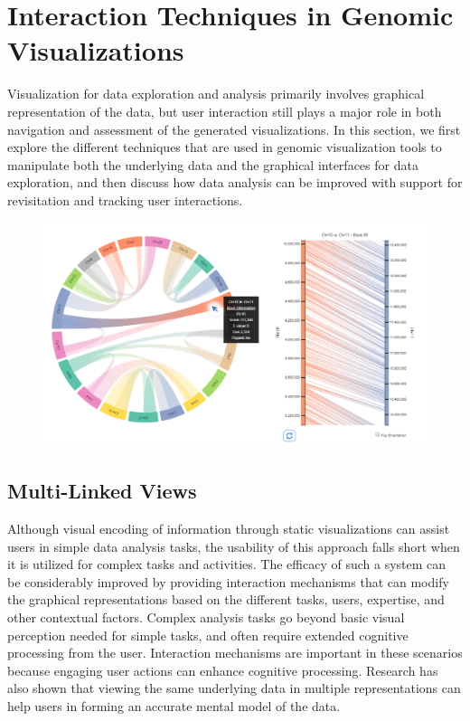 \section{Interaction Techniques in Genomic Visualizations}
Visualization for data exploration and analysis primarily involves graphical representation of the data, but user interaction still plays a major role in both navigation and assessment of the generated visualizations.  In this section, we first explore the different techniques that are used in genomic visualization tools to manipulate both the underlying data and the graphical interfaces for data exploration, and then discuss how data analysis can be improved with support for revisitation and tracking user interactions.

\begin{figure}
  \centering
  \includegraphics[width=0.95\linewidth]{images/ch_2_accusyn.PNG}
  \label{fig:ch_2_accusyn}
\end{figure}


\subsection{Multi-Linked Views}

Although visual encoding of information through static visualizations can assist users in simple data analysis tasks, the usability of this approach falls short when it is utilized for complex tasks and activities\cite{tominski2015interaction,dix1998starting,pike2009science,piringer2009multi,yi2007toward,sedig2013interaction}. The efficacy of such a system can be considerably improved by providing interaction mechanisms that can modify the graphical representations based on the different tasks, users, expertise, and other contextual factors\cite{sedig2013interaction}. Complex analysis tasks go beyond basic visual perception needed for simple tasks, and often require extended cognitive processing from the user. Interaction mechanisms are important in these scenarios because engaging user actions can enhance cognitive processing\cite{sedig2013interaction}. Research has also shown that viewing the same underlying data in multiple representations can help users in forming an accurate mental model of the data\cite{larkin1987diagram,stenning1995cognitive,sedig2005designing,wang2000guidelines}.

